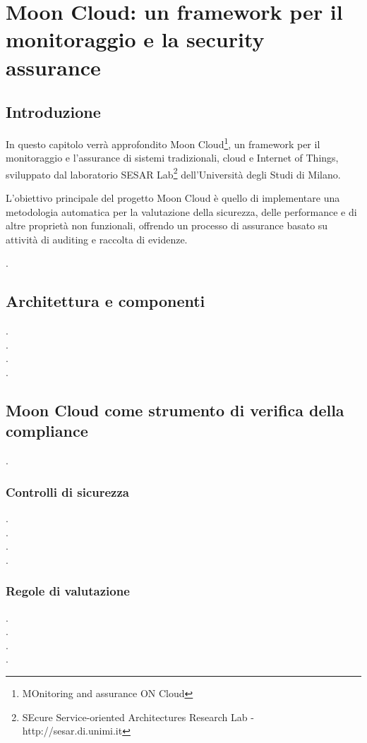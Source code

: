 \documentclass[../main.tex]{subfiles}
\begin{document}
\chapter{Moon Cloud: un framework per il monitoraggio e la security assurance}
\section{Introduzione}
In questo capitolo verrà approfondito Moon Cloud\footnote{MOnitoring and assurance ON Cloud }, un framework per il monitoraggio e l'assurance di sistemi tradizionali, cloud e Internet of Things, sviluppato dal laboratorio SESAR Lab\footnote{SEcure Service-oriented Architectures Research Lab - http://sesar.di.unimi.it} dell'Università degli Studi di Milano.

L'obiettivo principale del progetto Moon Cloud è quello di implementare una metodologia automatica per la valutazione della sicurezza, delle performance e di altre proprietà non funzionali, offrendo un processo di assurance basato su attività di auditing e raccolta di evidenze.

.\\\newpage
\section{Architettura e componenti}
\newpage
.\\\newpage
.\\\newpage
.\\\newpage
.\\\newpage
\section{Moon Cloud come strumento di verifica della compliance}
\newpage
.\\\newpage
\subsection{Controlli di sicurezza}
\newpage
.\\\newpage
.\\\newpage
.\\\newpage
.\\\newpage
\subsection{Regole di valutazione}
\newpage
.\\\newpage
.\\\newpage
.\\\newpage
.\\\newpage
\end{document}
